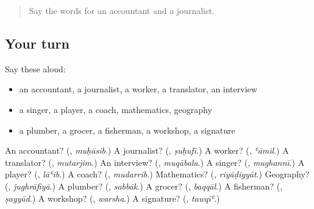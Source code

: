 \label{lesson:AR-R191-second-pass-words-from-chapters-189-191}



\begin{quote}
Say the words for an accountant and a journalist.
\end{quote}

\subsection*{Your turn}
Say these aloud:

\begin{itemize}
\raggedright
  \item an accountant, a journalist, a worker, a translator, an interview
  \item a singer, a player, a coach, mathematics, geography
  \item a plumber, a grocer, a fisherman, a workshop, a signature
\end{itemize}

\begin{tcolorbox}[breakable,colback=teal!4,colframe=teal!35!black,title={Before you move on}]
An accountant? (\textbf{}, \emph{muḥāsib}.) A journalist? (\textbf{}, \emph{ṣuḥufī}.) A worker? (\textbf{}, \emph{ʿāmil}.) A translator? (\textbf{}, \emph{mutarjim}.) An interview? (\textbf{}, \emph{muqābala}.) A singer? (\textbf{}, \emph{mughannī}.) A player? (\textbf{}, \emph{lāʿib}.) A coach? (\textbf{}, \emph{mudarrib}.) Mathematics? (\textbf{}, \emph{riyāḍiyyāt}.) Geography? (\textbf{}, \emph{jughrāfiyā}.) A plumber? (\textbf{}, \emph{sabbāk}.) A grocer? (\textbf{}, \emph{baqqāl}.) A fisherman? (\textbf{}, \emph{ṣayyād}.) A workshop? (\textbf{}, \emph{warsha}.) A signature? (\textbf{}, \emph{tawqīʿ}.)
\end{tcolorbox}
